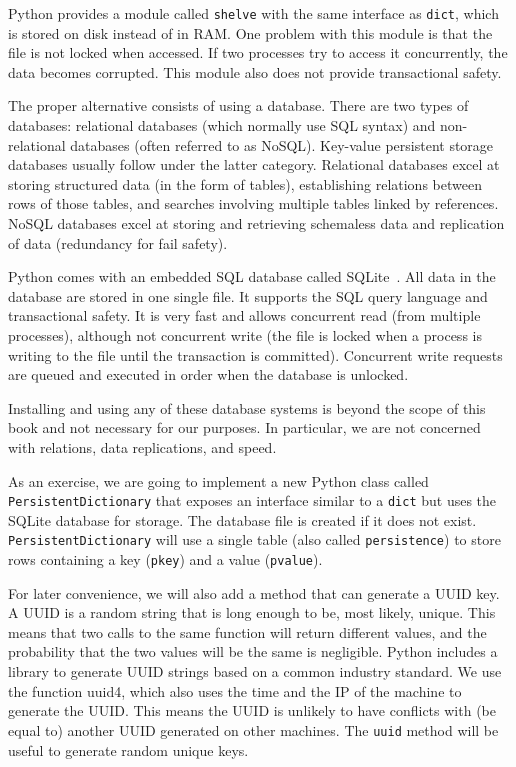 \documentclass[justified,sixbynine]{tufte-book}
\def\ft{\small\tt}
\theoremstyle{plain}%
\theoremstyle{definition}
\theoremstyle{remark}
\begin{document}
\begin{fullwidth}
Python provides a module called {\ft shelve} with the same interface as {\ft dict}, which is stored on disk instead of in RAM. One problem with this module is that the file is not locked when accessed. If two processes try to access it concurrently, the data becomes corrupted. This module also does not provide transactional safety.

The proper alternative consists of using a database. There are two types of databases: relational databases (which normally use SQL syntax) and non-relational databases (often referred to as NoSQL). Key-value persistent storage databases usually follow under the latter category. Relational databases excel at storing structured data (in the form of tables), establishing relations between rows of those tables, and searches involving multiple tables linked by references. NoSQL databases excel at storing and retrieving schemaless data and replication of data (redundancy for fail safety).

Python comes with an embedded SQL database called SQLite~\cite{sqlite}. All data in the database are stored in one single file. It supports the SQL query language and transactional safety. It is very fast and allows concurrent read (from multiple processes), although not concurrent write (the file is locked when a process is writing to the file until the transaction is committed). Concurrent write requests are queued and executed in order when the database is unlocked.

Installing and using any of these database systems is beyond the scope of this book and not necessary for our purposes. In particular, we are not concerned with relations, data replications, and speed.

As an exercise, we are going to implement a new Python class called {\ft PersistentDictionary} that exposes an interface similar to a {\ft dict} but uses the SQLite database for storage. The database file is created if it does not exist. {\ft PersistentDictionary} will use a single table (also called {\ft persistence}) to store rows containing a key ({\ft pkey}) and a value  ({\ft pvalue}).

For later convenience, we will also add a method that can generate a UUID key. A UUID is a random string that is long enough to be, most likely, unique. This means that two calls to the same function will return different values, and the probability that the two values will be the same is negligible. Python includes a library to generate UUID strings based on a common industry standard. We use the function uuid4, which also uses the time and the IP of the machine to generate the UUID. This means the UUID is unlikely to have conflicts with (be equal to) another UUID generated on other machines. The {\ft uuid} method will be useful to generate random unique keys.


\end{fullwidth}
\end{document}
